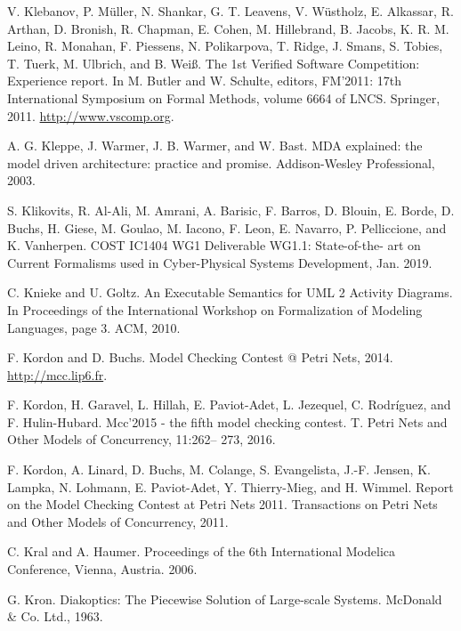 \begin{description}[style=nextline,leftmargin=12mm,labelwidth=10mm,font=\normalfont]
\item[{[165]}] V. Klebanov, P. Müller, N. Shankar, G. T. Leavens, V. Wüstholz, E. Alkassar, R. Arthan, D. Bronish, R. Chapman, E. Cohen, M. Hillebrand, B. Jacobs, K. R. M. Leino, R. Monahan, F. Piessens, N. Polikarpova, T. Ridge, J. Smans, S. Tobies, T. Tuerk, M. Ulbrich, and B. Weiß. The 1st Verified Software Competition: Experience report. In M. Butler and W. Schulte, editors, FM’2011: 17th International Symposium on Formal Methods, volume 6664 of LNCS. Springer, 2011. \url{http://www.vscomp.org}.

\item[{[166]}] A. G. Kleppe, J. Warmer, J. B. Warmer, and W. Bast. MDA explained: the model driven architecture: practice and promise. Addison-Wesley Professional, 2003.

\item[{[167]}] S. Klikovits, R. Al-Ali, M. Amrani, A. Barisic, F. Barros, D. Blouin, E. Borde, D. Buchs, H. Giese, M. Goulao, M. Iacono, F. Leon, E. Navarro, P. Pelliccione, and K. Vanherpen. COST IC1404 WG1 Deliverable WG1.1: State-of-the- art on Current Formalisms used in Cyber-Physical Systems Development, Jan. 2019.

\item[{[168]}] C. Knieke and U. Goltz. An Executable Semantics for UML 2 Activity Diagrams. In Proceedings of the International Workshop on Formalization of Modeling Languages, page 3. ACM, 2010.

\item[{[169]}] F. Kordon and D. Buchs. Model Checking Contest @ Petri Nets, 2014. \url{http://mcc.lip6.fr}.

\item[{[170]}] F. Kordon, H. Garavel, L. Hillah, E. Paviot-Adet, L. Jezequel, C. Rodríguez, and F. Hulin-Hubard. Mcc’2015 - the fifth model checking contest. T. Petri Nets and Other Models of Concurrency, 11:262– 273, 2016.

\item[{[171]}] F. Kordon, A. Linard, D. Buchs, M. Colange, S. Evangelista, J.-F. Jensen, K. Lampka, N. Lohmann, E. Paviot-Adet, Y. Thierry-Mieg, and H. Wimmel. Report on the Model Checking Contest at Petri Nets 2011. Transactions on Petri Nets and Other Models of Concurrency, 2011.

\item[{[172]}] C. Kral and A. Haumer. Proceedings of the 6th International Modelica Conference, Vienna, Austria. 2006.

\item[{[173]}] G. Kron. Diakoptics: The Piecewise Solution of Large-scale Systems. McDonald \& Co. Ltd., 1963.


\end{description}
